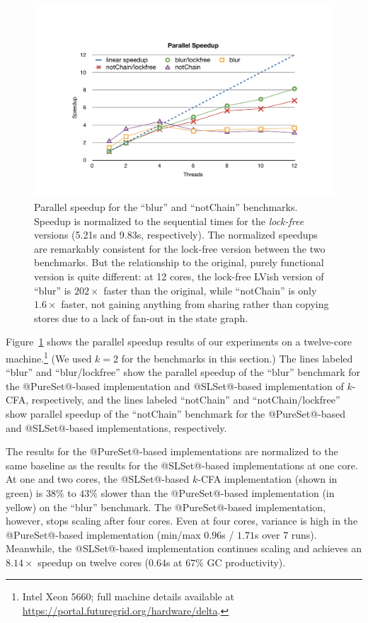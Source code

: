 \begin{figure}  
\begin{center}
  \includegraphics[trim=0.5in 0.5in 0.5in 1in,clip,width=\textwidth]{chapter4/figures/CFA_speedups.pdf}
\end{center}
  \caption{Parallel speedup for the ``blur'' and ``notChain''
    benchmarks.  Speedup is normalized to the sequential times for the
    \emph{lock-free} versions (5.21s and 9.83s, respectively).  The
    normalized speedups are remarkably consistent for the lock-free
    version between the two benchmarks.  But the relationship to the
    original, purely functional version is quite different: at 12
    cores, the lock-free LVish version of ``blur'' is $202\times$
    faster than the original, while ``notChain'' is only $1.6\times$
    faster, not gaining anything from sharing rather than copying
    stores due to a lack of fan-out in the state graph.  }
  \label{fig:bench}
\end{figure}

Figure~\ref{fig:bench} shows the parallel speedup results of our
experiments on a twelve-core machine.\footnote{Intel Xeon 5660; full
  machine details available at
  \url{https://portal.futuregrid.org/hardware/delta}.}  (We used $k=2$
for the benchmarks in this section.)  The lines labeled ``blur'' and
``blur/lockfree'' show the parallel speedup of the ``blur'' benchmark
for the @PureSet@-based implementation and @SLSet@-based
implementation of $k$-CFA, respectively, and the lines labeled
``notChain'' and ``notChain/lockfree'' show parallel speedup of the
``notChain'' benchmark for the @PureSet@-based and @SLSet@-based
implementations, respectively.

The results for the @PureSet@-based implementations are normalized to
the same baseline as the results for the @SLSet@-based implementations
at one core.  At one and two cores, the @SLSet@-based $k$-CFA
implementation (shown in green) is $38\%$ to $43\%$ slower than the
@PureSet@-based implementation (in yellow) on the ``blur'' benchmark.
The @PureSet@-based implementation, however, stops scaling after four
cores.  Even at four cores, variance is high in the @PureSet@-based
implementation (min/max $0.96$s / $1.71$s over 7 runs).  Meanwhile,
the @SLSet@-based implementation continues scaling and achieves an
$8.14\times$ speedup on twelve cores ($0.64$s at $67\%$ GC
productivity).

